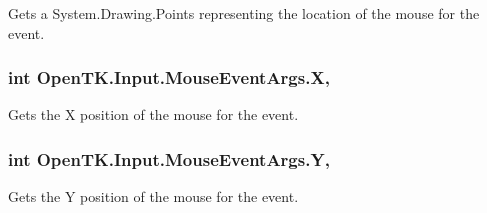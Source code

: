 Gets a System.\-Drawing.\-Points representing the location of the mouse for the event. 

\hypertarget{class_open_t_k_1_1_input_1_1_mouse_event_args_a160e6935affdb80c8e39a24e8aa7481d}{
\subsubsection[{X}]{\setlength{\rightskip}{0pt plus 5cm}int Open\-T\-K.\-Input.\-Mouse\-Event\-Args.\-X\hspace{0.3cm}{\ttfamily [get]}, {\ttfamily [set]}}}\label{class_open_t_k_1_1_input_1_1_mouse_event_args_a160e6935affdb80c8e39a24e8aa7481d}


Gets the X position of the mouse for the event. 

\hypertarget{class_open_t_k_1_1_input_1_1_mouse_event_args_a303956e7ce1e2a90cb76519ed63de5df}{
\subsubsection[{Y}]{\setlength{\rightskip}{0pt plus 5cm}int Open\-T\-K.\-Input.\-Mouse\-Event\-Args.\-Y\hspace{0.3cm}{\ttfamily [get]}, {\ttfamily [set]}}}\label{class_open_t_k_1_1_input_1_1_mouse_event_args_a303956e7ce1e2a90cb76519ed63de5df}


Gets the Y position of the mouse for the event. 

